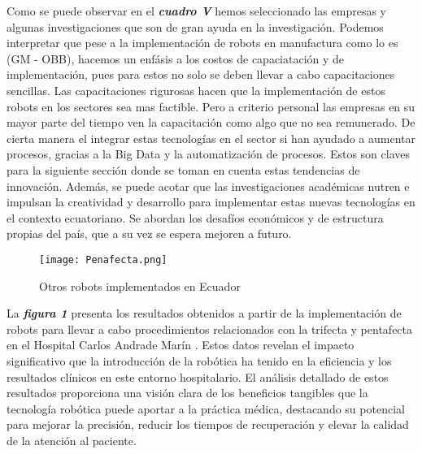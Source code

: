 \documentclass[conference]{IEEEtran}
\begin{document}
Como se puede observar en el \textit{\textbf{cuadro V}} hemos seleccionado las empresas y algunas investigaciones que son de gran ayuda en la investigación. Podemos interpretar que pese a la implementación de robots en manufactura como lo es (GM - OBB), hacemos un enfásis a los costos de capaciatación y de implementación, pues para estos no solo se deben llevar a cabo capacitaciones sencillas. Las capacitaciones rigurosas hacen que la implementación de estos robots en los sectores sea mas factible. Pero a criterio personal las empresas en su mayor parte del tiempo ven la capacitación como algo que no sea remunerado. De cierta manera el integrar estas tecnologías en el sector si han ayudado a aumentar procesos, gracias a la Big Data y la automatización de procesos. Estos son claves para la siguiente sección donde se toman en cuenta estas tendencias de innovación. Además, se puede acotar que las investigaciones académicas nutren e impulsan la creatividad y desarrollo para implementar estas nuevas tecnologías en el contexto ecuatoriano. Se abordan los desafíos económicos y de estructura propias del país, que a su vez se espera mejoren a futuro.

\begin{figure}
    \centering
    \texttt{[image: Penafecta.png]}
    \caption{Otros robots implementados en Ecuador}
    \label{fig:enter-label}
\end{figure}
La \textbf{\textit{figura 1}} presenta los resultados obtenidos a partir de la implementación de robots para llevar a cabo procedimientos relacionados con la trifecta y pentafecta en el Hospital Carlos Andrade Marín \cite{Salgado2024}. Estos datos revelan el impacto significativo que la introducción de la robótica ha tenido en la eficiencia y los resultados clínicos en este entorno hospitalario. El análisis detallado de estos resultados proporciona una visión clara de los beneficios tangibles que la tecnología robótica puede aportar a la práctica médica, destacando su potencial para mejorar la precisión, reducir los tiempos de recuperación y elevar la calidad de la atención al paciente.
\end{document}
